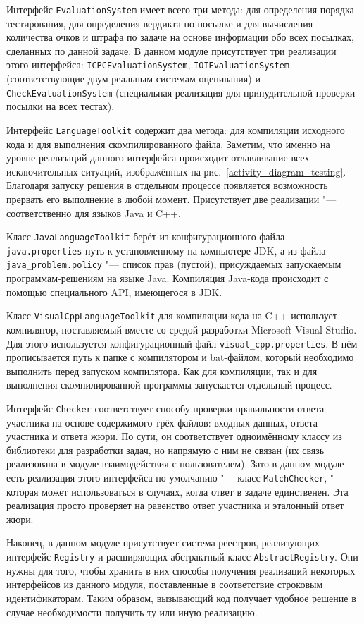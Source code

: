 Интерфейс \texttt{Evaluation\-System} имеет всего три метода: для определения порядка тестирования, для определения вердикта по посылке и для вычисления количества очков и штрафа по задаче на основе информации обо всех посылках, сделанных по данной задаче. В данном модуле присутствует три реализации этого интерфейса: \texttt{ICPC\-Evaluation\-System}, \texttt{IOI\-Evaluation\-System} (соответствующие двум реальным системам оценивания) и \texttt{Check\-Evaluation\-System} (специальная реализация для принудительной проверки посылки на всех тестах).

Интерфейс \texttt{Language\-Toolkit} содержит два метода: для компиляции исходного кода и для выполнения скомпилированного файла. Заметим, что именно на уровне реализаций данного интерфейса происходит отлавливание всех исключительных ситуаций, изображённых на рис.~\ref{activity_diagram_testing}. Благодаря запуску решения в отдельном процессе появляется возможность прервать его выполнение в любой момент. Присутствует две реализации "--- соответственно для языков Java и C++.

Класс \texttt{Java\-Language\-Toolkit} берёт из конфигурационного файла \texttt{java.pro\-perties} путь к установленному на компьютере JDK, а из файла \texttt{java\_problem.po\-licy} "--- список прав (пустой), присуждаемых запускаемым программам-решениям на языке Java. Компиляция Java-кода происходит с помощью специального API, имеющегося в JDK.

Класс \texttt{Visual\-Cpp\-Language\-Toolkit} для компиляции кода на C++ использует компилятор, поставляемый вместе со средой разработки Microsoft Visual Studio. Для этого используется конфигурационный файл \texttt{visual\_cpp.properties}. В нём прописывается путь к папке с компилятором и bat-файлом, который необходимо выполнить перед запуском компилятора. Как для компиляции, так и для выполнения скомпилированной программы запускается отдельный процесс.

Интерфейс \texttt{Checker} соответствует способу проверки правильности ответа участника на основе содержимого трёх файлов: входных данных, ответа участника и ответа жюри. По сути, он соответствует одноимённому классу из библиотеки для разработки задач, но напрямую с ним не связан (их связь реализована в модуле взаимодействия с пользователем). Зато в данном модуле есть реализация этого интерфейса по умолчанию "--- класс \texttt{MatchChecker}, "--- которая может использоваться в случаях, когда ответ в задаче единственен. Эта реализация просто проверяет на равенство ответ участника и эталонный ответ жюри.

Наконец, в данном модуле присутствует система реестров, реализующих интерфейс \texttt{Registry} и расширяющих абстрактный класс \texttt{AbstractRegistry}. Они нужны для того, чтобы хранить в них способы получения реализаций некоторых интерфейсов из данного модуля, поставленные в соответствие строковым идентификаторам. Таким образом, вызывающий код получает удобное решение в случае необходимости получить ту или иную реализацию.